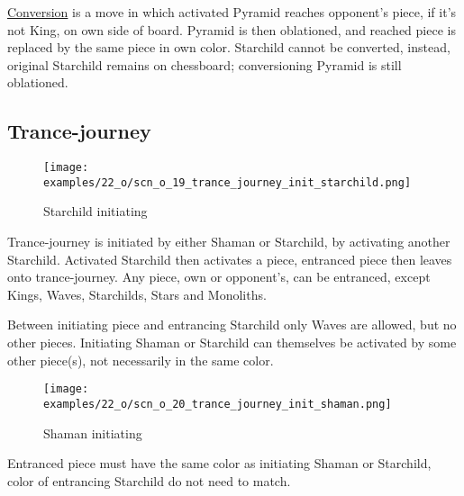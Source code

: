 \hyperref[sec:Mayan Ascendancy/Pyramid/Conversion]{Conversion} is a move in which activated
Pyramid reaches opponent's piece, if it's not King, on own side of board. Pyramid is then
oblationed, and reached piece is replaced by the same piece in own color.
Starchild cannot be converted, instead, original Starchild remains on chessboard;
conversioning Pyramid is still oblationed.

\clearpage %

\subsection*{Trance-journey}

\vspace*{-1.1\baselineskip}
\noindent
\begin{wrapfigure}[11]{l}{0.4\textwidth}
\centering
\texttt{[image: examples/22\_o/scn\_o\_19\_trance\_journey\_init\_starchild.png]}
\caption{Starchild initiating}
\label{fig:scn_o_19_trance_journey_init_starchild}
\end{wrapfigure}
Trance-journey is initiated by either Shaman or Starchild, by activating another Starchild.
Activated Starchild then activates a piece, entranced piece then leaves onto trance-journey.
Any piece, own or opponent's, can be entranced, except Kings, Waves, Starchilds, Stars and
Monoliths.

Between initiating piece and entrancing Starchild only Waves are allowed, but no other pieces.
Initiating Shaman or Starchild can themselves be activated by some other piece(s), not necessarily
in the same color.

\vspace*{-0.3\baselineskip}
\noindent
\begin{wrapfigure}[10]{l}{0.4\textwidth}
\centering
\texttt{[image: examples/22\_o/scn\_o\_20\_trance\_journey\_init\_shaman.png]}
\caption{Shaman initiating}
\label{fig:scn_o_20_trance_journey_init_shaman}
\end{wrapfigure}
Entranced piece must have the same color as initiating Shaman or Starchild, color of
entrancing Starchild do not need to match.

